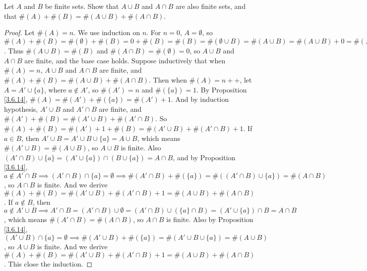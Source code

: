 \begin{exercise}\label{ex 3.6.9}
    Let \(A\) and \(B\) be finite sets.
    Show that \(A \cup B\) and \(A \cap B\) are also finite sets, and that \(\#(A) + \#(B) = \#(A \cup B) + \#(A \cap B)\).
\end{exercise}

\begin{proof}
    Let \(\#(A) = n\).
    We use induction on \(n\).
    For \(n = 0\), \(A = \emptyset\), so \(\#(A) + \#(B) = \#(\emptyset) + \#(B) = 0 + \#(B) = \#(B) = \#(\emptyset \cup B) = \#(A \cup B) = \#(A \cup B) + 0 = \#(A \cup B) + \#(\emptyset) = \#(A \cup B) + \#(\emptyset \cap B) = \#(A \cup B) + \#(A \cap B)\).
    Thus \(\#(A \cup B) = \#(B)\) and \(\#(A \cap B) = \#(\emptyset) = 0\), so \(A \cup B\) and \(A \cap B\) are finite, and the base case holds.
    Suppose inductively that when \(\#(A) = n\), \(A \cup B\) and \(A \cap B\) are finite, and \(\#(A) + \#(B) = \#(A \cup B) + \#(A \cap B)\).
    Then when \(\#(A) = n++\), let \(A = A' \cup \{a\}\), where \(a \notin A'\), so \(\#(A') = n\) and \(\#(\{a\}) = 1\).
    By Proposition \ref{3.6.14}, \(\#(A) = \#(A') + \#(\{a\}) = \#(A') + 1\).
    And by induction hypothesis, \(A' \cup B\) and \(A' \cap B\) are finite, and \(\#(A') + \#(B) = \#(A' \cup B) + \#(A' \cap B)\).
    So \(\#(A) + \#(B) = \#(A') + 1 + \#(B) = \#(A' \cup B) + \#(A' \cap B) + 1\).
    If \(a \in B\), then \(A' \cup B = A' \cup B \cup \{a\} = A \cup B\), which means \(\#(A' \cup B) = \#(A \cup B)\), so \(A \cup B\) is finite.
    Also \((A' \cap B) \cup \{a\} = (A' \cup \{a\}) \cap (B \cup \{a\}) = A \cap B\), and by Proposition \ref{3.6.14}, \(a \notin A' \cap B \implies (A' \cap B) \cap \{a\} = \emptyset \implies \#(A' \cap B) + \#(\{a\}) = \#((A' \cap B) \cup \{a\}) = \#(A \cap B)\), so \(A \cap B\) is finite.
    And we derive \(\#(A) + \#(B) = \#(A' \cup B) + \#(A' \cap B) + 1 = \#(A \cup B) + \#(A \cap B)\).
    If \(a \notin B\), then \(a \notin A' \cup B \implies A' \cap B = (A' \cap B) \cup \emptyset = (A' \cap B) \cup (\{a\} \cap B) = (A' \cup \{a\}) \cap B = A \cap B\), which means \(\#(A' \cap B) = \#(A \cap B)\), so \(A \cap B\) is finite.
    Also by Proposition \ref{3.6.14}, \((A' \cup B) \cap \{a\} = \emptyset \implies \#(A' \cup B) + \#(\{a\}) = \#(A' \cup B \cup \{a\}) = \#(A \cup B)\), so \(A \cup B\) is finite.
    And we derive \(\#(A) + \#(B) = \#(A' \cup B) + \#(A' \cap B) + 1 = \#(A \cup B) + \#(A \cap B)\).
    This close the induction.
\end{proof}

